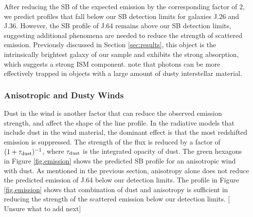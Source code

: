 \documentclass[twocolumn]{aastex61}
\begin{document}
After reducing the SB of the expected  emission by the corresponding factor of 2, we predict profiles that fall below our SB detection limits for galaxies J.26 and J.36. However, the SB profile of J.64 remains above our SB detection limits, suggesting additional phenomena are needed to reduce the strength of scattered emission. Previously discussed in Section \ref{sec:results}, this object is the intrinsically brightest galaxy of our sample and exhibits the strong  absorption, which suggests a strong ISM component. \cite{Prochaska_2011} note that  photons can be more effectively trapped in objects with a large amount of dusty interstellar material. 

\subsubsection{Anisotropic and Dusty Winds}

Dust in the wind is another factor that can reduce the observed emission strength, and affect the shape of the line profile. 
In the \cite{Prochaska_2011} radiative models that include dust in the wind material, the dominant effect is that the most redshifted emission is suppressed. The strength of the flux is reduced by a factor of $(1+\tau_{\rm{dust}})^{-1}$, where $\tau_{\rm{dust}}$ is the integrated opacity of dust. The green hexagons in Figure \ref{fig.emission} shows the predicted SB profile for an anisotropic wind with dust. As mentioned in the previous section, anisotropy alone does not reduce the predicted emission of J.64 below our detection limits. The profile in  Figure \ref{fig.emission} shows that combination of dust and anisotropy is sufficient in reducing the strength of the scattered emission below our detection limits. [ Unsure what to add next]
\end{document}

